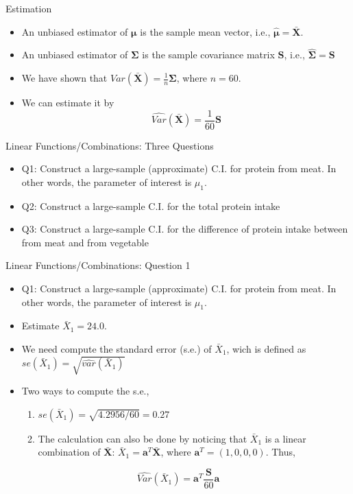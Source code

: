 \documentclass[
  ignorenonframetext,
]{beamer}
\providecommand{\tightlist}{%
  \setlength{\itemsep}{0pt}\setlength{\parskip}{0pt}}
\begin{document}
\begin{frame}{Estimation}
\protect\hypertarget{estimation}{}
\begin{itemize}
\tightlist
\item
  An unbiased estimator of \(\boldsymbol\mu\) is the sample mean vector,
  i.e., \(\hat{\boldsymbol \mu}=\bar{\mathbf X}\).
\item
  An unbiased estimator of \(\boldsymbol \Sigma\) is the sample
  covariance matrix \(\mathbf S\), i.e.,
  \(\hat{\boldsymbol \Sigma}=\mathbf S\)
\item
  We have shown that
  \(Var(\bar{\mathbf X})=\frac{1}{n}\boldsymbol \Sigma\), where
  \(n=60\).
\item
  We can estimate it by
  \[\hat{Var}(\bar{\mathbf X})=\frac{1}{60}\mathbf S\]
\end{itemize}
\end{frame}

\begin{frame}{Linear Functions/Combinations: Three Questions}
\protect\hypertarget{linear-functionscombinations-three-questions}{}
\begin{itemize}
\item
  Q1: Construct a large-sample (approximate) C.I. for protein from meat.
  In other words, the parameter of interest is \(\mu_1\).
\item
  Q2: Construct a large-sample C.I. for the total protein intake
\item
  Q3: Construct a large-sample C.I. for the difference of protein intake
  between from meat and from vegetable
\end{itemize}
\end{frame}

\begin{frame}{Linear Functions/Combinations: Question 1}
\protect\hypertarget{linear-functionscombinations-question-1}{}
\begin{itemize}
\tightlist
\item
  Q1: Construct a large-sample (approximate) C.I. for protein from meat.
  In other words, the parameter of interest is \(\mu_1\).
\item
  Estimate \(\bar X_1=24.0\).
\item
  We need compute the standard error (s.e.) of \(\bar X_1\), wich is
  defined as \(se(\bar X_1)=\sqrt{\hat{var}(\bar X_1)}\)
\item
  Two ways to compute the s.e.,

  \begin{enumerate}
  \tightlist
  \item
    \(se(\bar X_1)=\sqrt{4.2956/60}=0.27\)
  \item
    The calculation can also be done by noticing that \(\bar X_1\) is a
    linear combination of \(\bar{\mathbf X}\):
    \(\bar X_1 =\mathbf a^T \bar{\mathbf X}\), where
    \(\mathbf a^T=(1, 0, 0, 0)\). Thus,
  \end{enumerate}
\end{itemize}

\[\hat{Var}(\bar X_1)=\mathbf a^T \frac{\mathbf S}{60} \mathbf a\]
\end{frame}
\end{document}
